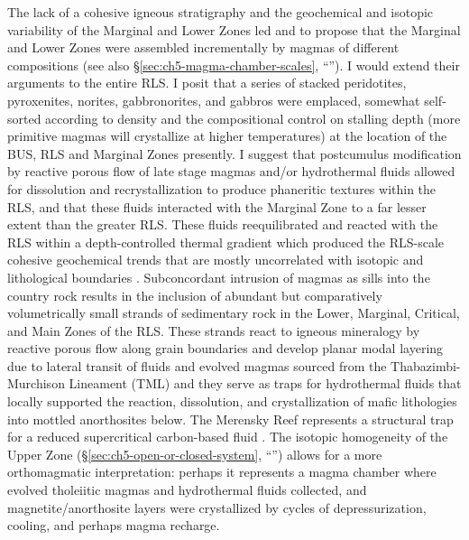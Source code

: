 The lack of a cohesive igneous stratigraphy and the geochemical and
isotopic variability of the Marginal and Lower Zones led
\citet{mitchell2023} and \citet{scoon2023} to propose that the Marginal
and Lower Zones were assembled incrementally by magmas of different compositions (see also \S\ref{sec:ch5-magma-chamber-scales}, ``''). I would extend their arguments to the entire RLS. I posit
that a series of stacked peridotites, pyroxenites, norites,
gabbronorites, and gabbros were emplaced, somewhat self-sorted according
to density and the compositional control on stalling depth (more
primitive magmas will crystallize at higher temperatures) at the
location of the BUS, RLS and Marginal Zones presently. I suggest that
postcumulus modification by reactive porous flow of late stage magmas
and/or hydrothermal fluids allowed for dissolution and recrystallization
to produce phaneritic textures within the RLS, and that these fluids
interacted with the Marginal Zone to a far lesser extent than the
greater RLS. These fluids reequilibrated and reacted with the RLS within
a depth-controlled thermal gradient which produced the RLS-scale
cohesive geochemical trends that are mostly uncorrelated with isotopic
and lithological boundaries \citep[see][]{eales1986}. Subconcordant
intrusion of magmas as sills into the country rock results in the
inclusion of abundant but comparatively volumetrically small strands of
sedimentary rock in the Lower, Marginal, Critical, and Main Zones of the
RLS. These strands react to igneous mineralogy by reactive porous flow
along grain boundaries and develop planar modal layering due to lateral
transit of fluids and evolved magmas sourced from the
Thabazimbi-Murchison Lineament (TML) and they serve as traps for
hydrothermal fluids that locally supported the reaction, dissolution,
and crystallization of mafic lithologies into mottled anorthosites
below. The Merensky Reef represents a structural trap for a reduced
supercritical carbon-based fluid \citep[see also \S\ref{sec:ch5-unusual-volatile-phases-in-the-lower-rls}, ``'']{ballhaus1985}. The
isotopic homogeneity of the Upper Zone (\S\ref{sec:ch5-open-or-closed-system}, ``'') allows for a more orthomagmatic
interpretation: perhaps it represents a magma chamber where evolved
tholeiitic magmas and hydrothermal fluids collected, and
magnetite/anorthosite layers were crystallized by cycles of
depressurization, cooling, and perhaps magma recharge.

